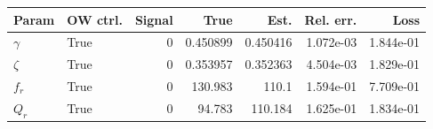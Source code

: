 \begin{tabular}{llrrrrr}
\hline
Param & OW ctrl. & Signal & True & Est. & Rel. err. & Loss \\
\hline
$\gamma$ & True & 0 & 0.450899 & 0.450416 & 1.072e-03 & 1.844e-01 \\
$\zeta$ & True & 0 & 0.353957 & 0.352363 & 4.504e-03 & 1.829e-01 \\
$f_r$ & True & 0 & 130.983 & 110.1 & 1.594e-01 & 7.709e-01 \\
$Q_r$ & True & 0 & 94.783 & 110.184 & 1.625e-01 & 1.834e-01 \\
\hline
\end{tabular}
